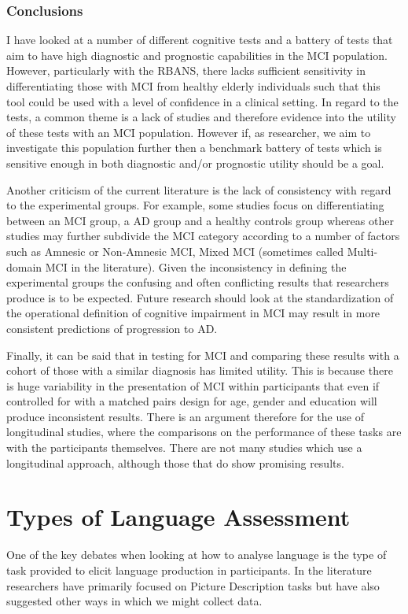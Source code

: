 \documentclass[10pt, letterpaper, twoside, openany]{book}
\begin{document}
\subsubsection{Conclusions}
I have looked at a number of different cognitive tests and a battery of tests that aim to have high diagnostic and prognostic capabilities in the MCI population. However, particularly with the RBANS, there lacks sufficient sensitivity in differentiating those with MCI from healthy elderly individuals such that this tool could be used with a level of confidence in a clinical setting. In regard to the tests, a common theme is a lack of studies and therefore evidence into the utility of these tests with an MCI population. However if, as researcher, we aim to investigate this population further then a benchmark battery of tests which is sensitive enough in both diagnostic and/or prognostic utility should be a goal. 
\par 
Another criticism of the current literature is the lack of consistency with regard to the experimental groups. For example, some studies focus on differentiating between an MCI group, a AD group and a healthy controls group whereas other studies may further subdivide the MCI category according to a number of factors such as Amnesic or Non-Amnesic MCI, Mixed MCI (sometimes called Multi-domain MCI in the literature). Given the inconsistency in defining the experimental groups the confusing and often conflicting results that researchers produce is to be expected. Future research should look at the standardization of the operational definition of cognitive impairment in MCI may result in more consistent predictions of progression to AD. 
\par 
Finally, it can be said that in testing for MCI and comparing these results with a cohort of those with a similar diagnosis has limited utility. This is because there is huge variability in the presentation of MCI within participants that even if controlled for with a matched pairs design for age, gender and education will produce inconsistent results. There is an argument therefore for the use of longitudinal studies, where the comparisons on the performance of these tasks are with the participants themselves. There are not many studies which use a longitudinal approach, although those that do show promising results.

\section{Types of Language Assessment}
One of the key debates when looking at how to analyse language is the type of task provided to elicit language production in participants. In the literature researchers have primarily focused on Picture Description tasks but have also suggested other ways in which we might collect data.
\par
\end{document}
